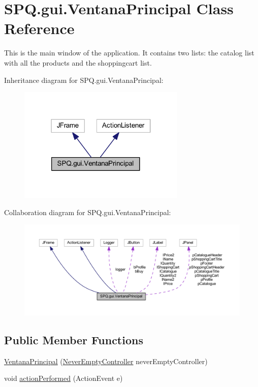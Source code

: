 \hypertarget{class_s_p_q_1_1gui_1_1_ventana_principal}{}\section{S\+P\+Q.\+gui.\+Ventana\+Principal Class Reference}
\label{class_s_p_q_1_1gui_1_1_ventana_principal}


This is the main window of the application. It contains two lists\+: the catalog list with all the products and the shoppingcart list.  




Inheritance diagram for S\+P\+Q.\+gui.\+Ventana\+Principal\+:\nopagebreak
\begin{figure}[H]
\begin{center}
\leavevmode
\includegraphics[width=226pt]{class_s_p_q_1_1gui_1_1_ventana_principal__inherit__graph}
\end{center}
\end{figure}


Collaboration diagram for S\+P\+Q.\+gui.\+Ventana\+Principal\+:\nopagebreak
\begin{figure}[H]
\begin{center}
\leavevmode
\includegraphics[width=350pt]{class_s_p_q_1_1gui_1_1_ventana_principal__coll__graph}
\end{center}
\end{figure}
\subsection*{Public Member Functions}
\begin{DoxyCompactItemize}
\item 
\mbox{\hyperlink{class_s_p_q_1_1gui_1_1_ventana_principal_ab35bb8c8e3a0b03050093cc3d6b58a90}{Ventana\+Principal}} (\mbox{\hyperlink{class_s_p_q_1_1controller_1_1_never_empty_controller}{Never\+Empty\+Controller}} never\+Empty\+Controller)
\item 
void \mbox{\hyperlink{class_s_p_q_1_1gui_1_1_ventana_principal_a8cb181f9dff7128cd674383688ca2c56}{action\+Performed}} (Action\+Event e)
\end{DoxyCompactItemize}
